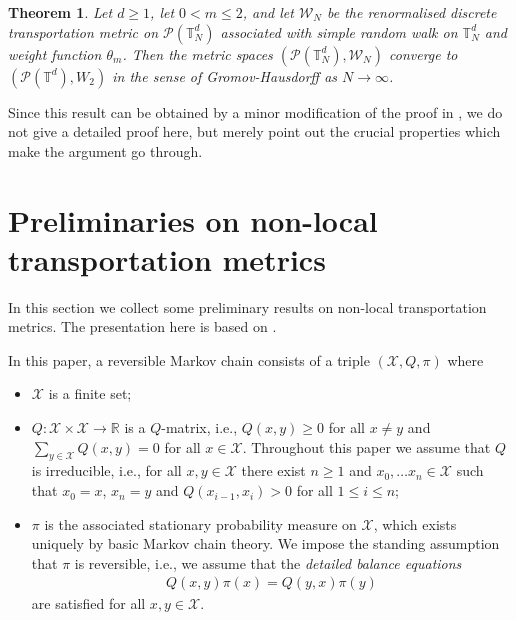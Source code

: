 \documentclass[a4paper,11pt,reqno]{amsart}
\theoremstyle{plain}
\newtheorem{theorem}{Theorem}[section]
\theoremstyle{remark}
\numberwithin{equation}{section}
\begin{document}
\begin{theorem}\label{thm:GH-intro}
  Let $d \geq 1$, let $0 < m \leq 2$, and let ${\mathcal{W}_N}$ be the
  renormalised discrete transportation metric on ${\mathcal{P}({{{\mathbb{T}_N^d}}})}$ associated
  with simple random walk on ${{{\mathbb{T}_N^d}}}$ and weight function $\theta_m$.
  Then the metric spaces $({\mathcal{P}({{{\mathbb{T}_N^d}}})},{\mathcal{W}}_N)$ converge to
  $({\mathscr{P}}(\mathbb{T}^d),W_2)$ in the sense of Gromov-Hausdorff as $N \to
  \infty$.
\end{theorem}

Since this result can be obtained by a minor modification of the proof
in \cite{GM12}, we do not give a detailed proof here, but merely point
out the crucial properties which make the argument go through.

\section{Preliminaries on non-local transportation metrics}
\label{sec:prelim}
  
In this section we collect some preliminary results on non-local
transportation metrics. The presentation here is based on \cite{Ma11}.
  
In this paper, a reversible Markov chain consists of a triple $({\mathcal{X}},
Q, \pi)$ where
\begin{itemize}
\item ${\mathcal{X}}$ is a finite set;
\item $Q : {\mathcal{X}} \times {\mathcal{X}} \to {{\mathbb R}}$ is a $Q$-matrix, i.e., $Q(x,y) \geq
  0$ for all $x \neq y$ and $\sum_{y \in {\mathcal{X}}} Q(x,y) = 0$ for all $x
  \in {\mathcal{X}}$. Throughout this paper we assume that $Q$ is irreducible,
  i.e., for all $x,y \in {\mathcal{X}}$ there exist $n \geq 1$ and $x_0, \ldots
  x_n \in {\mathcal{X}}$ such that $x_0 = x$, $x_n = y$ and $Q(x_{i-1},x_i)> 0$
  for all $1 \leq i \leq n$;
\item $\pi$ is the associated stationary probability measure on ${\mathcal{X}}$,
  which exists uniquely by basic Markov chain theory. We impose the
  standing assumption that $\pi$ is reversible, i.e., we assume that
  the \emph{detailed balance equations}
\begin{align}\label{eq:detailed-balance}
 Q(x,y)\pi(x) = Q(y,x)\pi(y)
\end{align}
are satisfied for all $x, y \in {\mathcal{X}}$.
\end{itemize}
\end{document}
